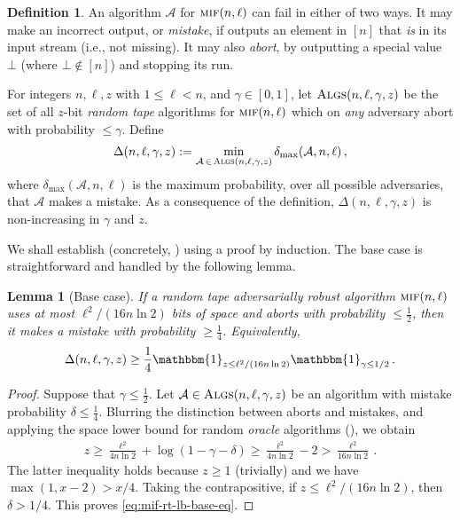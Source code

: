 \documentclass[10pt,a4paper]{article}
\newtheorem{lemma}[theorem]{Lemma}
\theoremstyle{definition}
\newtheorem{definition}[theorem]{Definition}
\theoremstyle{remark}
\newcommand{\indic}{\mathbbm{1}}
\newcommand{\cA}{\mathcal{A}}
\newcommand{\mif}{\textsc{mif}\xspace}
\newcommand{\Algs}{\textsc{Algs}\xspace}
\newcommand{\rl}{\mathbf{\ell}}             %
\newcommand{\Mstk}{\Delta}                  %
\begin{document}
\begin{itemize}
\begin{itemize}
\begin{definition}\label{def:mif-rt-err-complexity}
  An algorithm $\cA$ for $\mif(n,\rl)$ can fail in either of two ways. It may
  make an incorrect output, or {\em mistake}, if outputs an element in $[n]$
  that {\em is} in its input stream (i.e., not missing). It may also {\em
  abort}, by outputting a special value $\bot$ (where $\bot \notin [n]$)
  and stopping its run.
 
  For integers $n,\rl,z$ with $1 \le \rl < n$, and $\gamma \in [0,1]$, let
  $\Algs(n,\rl,\gamma,z)$ be the set of all $z$-bit \emph{random tape}
  algorithms for $\mif(n,\rl)$ which on \emph{any} adversary abort
  with probability $\le \gamma$. Define
  \begin{align*}
    \Mstk(n,\rl,\gamma,z) := \min_{\cA \,\in\, \Algs(n,\rl,\gamma,z)} 
      \delta_{\max}(\cA, n,\rl) \,,
  \end{align*}
  where $\delta_{\max}(\cA, n,\rl)$ is the maximum probability, over all
  possible adversaries, that $\cA$ makes a mistake. As a consequence of the
  definition, $\Mstk(n,\rl,\gamma,z)$ is non-increasing in $\gamma$ and $z$.
\end{definition}

We shall establish  (concretely, ) using
a proof by induction. The base case is straightforward and handled by the
following lemma.

\begin{lemma}[Base case]\label{lem:mif-rt-lb-base-case}
  If a random tape adversarially robust algorithm $\mif(n,\rl)$ uses at most
  $\rl^2/(16 n \ln 2)$ bits of space and aborts with probability $\le \frac12$,
  then it makes a mistake with probability $\ge \frac14$. Equivalently,
  \begin{align}
    \Mstk(n,\rl,\gamma,z) 
    \ge \frac{1}{4} \indic_{z \le \rl^2 / (16 n \ln 2)} \indic_{\gamma \le 1/2} \,.
    \label{eq:mif-rt-lb-base-eq}
  \end{align}
\end{lemma}
%
\begin{proof}%
  Suppose that $\gamma \le \frac12$. Let $\cA \in \Algs(n,\rl,\gamma,z)$ be an
  algorithm with mistake probability $\delta \le \frac14$. Blurring the
  distinction between aborts and mistakes, and applying the space lower bound
  for random {\em oracle} algorithms (), we obtain
  \begin{align*}
    z \ge \frac{\rl^2}{4 n \ln 2} + \log(1 - \gamma - \delta) 
    \ge \frac{\rl^2}{4 n \ln 2} - 2 > \frac{\rl^2}{16 n \ln 2} \,.
  \end{align*}
  The latter inequality holds because $z \ge 1$ (trivially) and we have
  $\max(1, x-2) > x/4$. Taking the contrapositive, if $z \le \rl^2 / (16 n \ln
  2)$, then $\delta > 1/4$. This proves \cref{eq:mif-rt-lb-base-eq}.
\end{proof}


\end{itemize}
\end{itemize}
\end{document}
